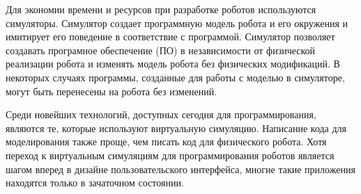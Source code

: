 Для экономии времени и ресурсов при разработке роботов используются симуляторы. Симулятор создает программную модель робота и его окружения и имитирует его поведение в соответствие с программой. Симулятор позволяет создавать програмное обеспечение (ПО) в независимости от физической реализации робота и изменять модель робота без физических модификаций. В некоторых случаях программы, созданные для работы с моделью в симуляторе, могут быть перенесены на робота без изменений.

Среди новейших технологий, доступных сегодня для программирования, являются те, которые используют виртуальную симуляцию. Написание кода для моделирования также проще, чем писать код для физического робота. Хотя переход к виртуальным симуляциям для программирования роботов является шагом вперед в дизайне пользовательского интерфейса, многие такие приложения находятся только в зачаточном состоянии.



